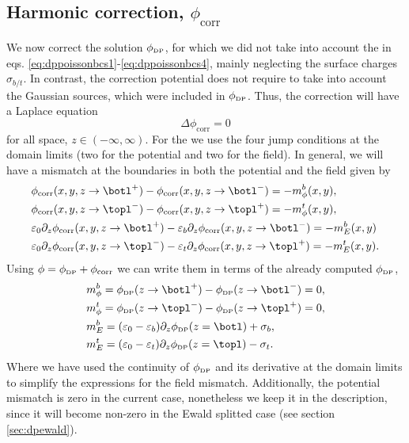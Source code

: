 \documentclass[ twoside,openright,titlepage,numbers=noenddot,%
headinclude,footinclude,cleardoublepage=empty,abstract=on,
BCOR=5mm,paper=a4,fontsize=11pt, dvipsnames
]{scrreprt}
\newcommand{\corr}{\text{corr}}
\newcommand{\dpr}{\text{\tiny DP}}
\begin{document}
\subsection{Harmonic correction, $\phi_{\corr}$}\label{sec:dpcorr}
We now correct the solution $\phi_{\dpr}$, for which we did not take into account the \bcs in eqs. \eqref{eq:dppoissonbcs1}-\eqref{eq:dppoissonbcs4}, mainly neglecting the surface charges $\sigma_{b/t}$. In contrast, the correction potential does not require to take into account the Gaussian sources, which were included in $\phi_{\dpr}$. Thus, the correction will have a Laplace equation
\begin{equation}
  \label{eq:dppoissonlaplacecorr}
  \Delta \phi_{\corr} = 0
\end{equation}
for all space, $z\in(-\infty, \infty)$. For the \bcs we use the four jump conditions at the domain limits (two for the potential and two for the field). In general, we will have a mismatch at the boundaries in both the potential and the field given by
\begin{equation}
  \label{eq:dppoissonmismatchcorr}
  \begin{aligned}
    &\phi_{\corr}(x,y,z\rightarrow \botl^+) - \phi_{\corr}(x,y,z\rightarrow \botl^-) = -m_{\phi}^{b}(x,y),\\
    &\phi_{\corr}(x,y,z\rightarrow \topl^-) - \phi_{\corr}(x,y,z\rightarrow \topl^+) = -m_{\phi}^{t}(x,y),\\
    &\varepsilon_0\partial_z\phi_{\corr}(x,y,z\rightarrow \botl^+) - \varepsilon_{b}\partial_z\phi_{\corr}(x,y,z\rightarrow \botl^-) = -m_E^{b}(x,y)\\
    &\varepsilon_0\partial_z\phi_{\corr}(x,y,z\rightarrow \topl^-) - \varepsilon_{t}\partial_z\phi_{\corr}(x,y,z\rightarrow \topl^+) = -m_E^{t}(x,y).
  \end{aligned}
\end{equation}
Using $\phi = \phi_{\dpr} + \phi_{\corr}$ we can write them in terms of the already computed $\phi_{\dpr}$, 
\begin{equation}
  \begin{aligned}
    &m_{\phi}^{b} = \phi_{\dpr}(z\rightarrow \botl^+) - \phi_{\dpr}(z\rightarrow \botl^-) = 0,\\
    &m_{\phi}^{t} = \phi_{\dpr}(z\rightarrow \topl^-) - \phi_{\dpr}(z\rightarrow \topl^+) = 0,\\
    &m_E^{b} = (\varepsilon_0 - \varepsilon_{b})\partial_z\phi_{\dpr}(z=\botl) + \sigma_{b},\\
    &m_E^{t} = (\varepsilon_0 - \varepsilon_{t})\partial_z\phi_{\dpr}(z=\topl) - \sigma_{t}.
  \end{aligned}
\end{equation}
Where we have used the continuity of $\phi_{\dpr}$ and its derivative at the domain limits to simplify the expressions for the field mismatch. Additionally, the potential mismatch is zero in the current case, nonetheless we keep it in the description, since it will become non-zero in the Ewald splitted case (see section \ref{sec:dpewald}).
\end{document}
